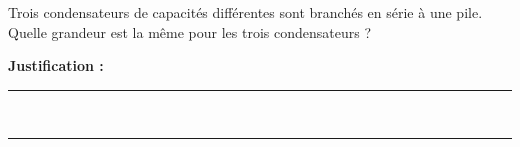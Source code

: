 Trois condensateurs de capacités différentes sont branchés en série à une pile. Quelle grandeur est la même pour les trois condensateurs ?

\choices

\noindent\textbf{Justification :} \hrulefill \\[2.5ex]
\rule{\linewidth}{0.4pt} \\[2.5ex]
\rule{\linewidth}{0.4pt}
\vfill
